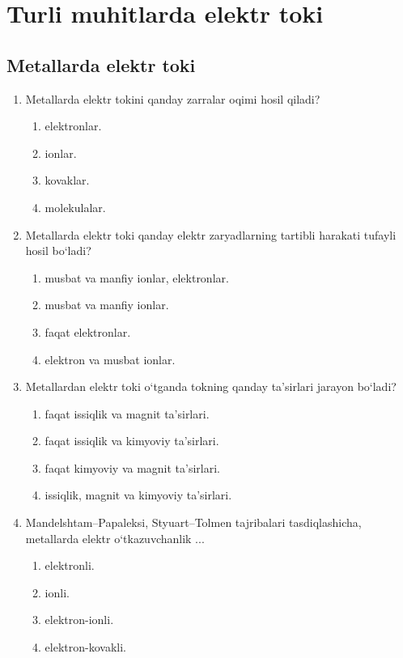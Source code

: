 \section{Turli muhitlarda elektr toki}

\subsection*{Metallarda elektr toki}



\begin{enumerate}

\item Metallarda elektr tokini qanday zarralar oqimi hosil qiladi?
\begin{enumerate}[label=\Alph*)]
\item elektronlar.
\item ionlar.
\item kovaklar.
\item molekulalar.
\end{enumerate}

\item Metallarda elektr toki qanday elektr zaryadlarning tartibli harakati tufayli hosil bo‘ladi?
\begin{enumerate}[label=\Alph*)]
\item musbat va manfiy ionlar, elektronlar.
\item musbat va manfiy ionlar.
\item faqat elektronlar.
\item elektron va musbat ionlar.
\end{enumerate}

\item Metallardan elektr toki o‘tganda tokning qanday ta’sirlari jarayon bo‘ladi?
\begin{enumerate}[label=\Alph*)]
\item faqat issiqlik va magnit ta’sirlari.
\item faqat issiqlik va kimyoviy ta’sirlari.
\item faqat kimyoviy va magnit ta’sirlari.
\item issiqlik, magnit va kimyoviy ta’sirlari.
\end{enumerate}

\item Mandelshtam–Papaleksi, Styuart–Tolmen tajribalari tasdiqlashicha, metallarda elektr o‘tkazuvchanlik ...
\begin{enumerate}[label=\Alph*)]
\item elektronli.
\item ionli.
\item elektron-ionli.
\item elektron-kovakli.
\end{enumerate}


\end{enumerate}
